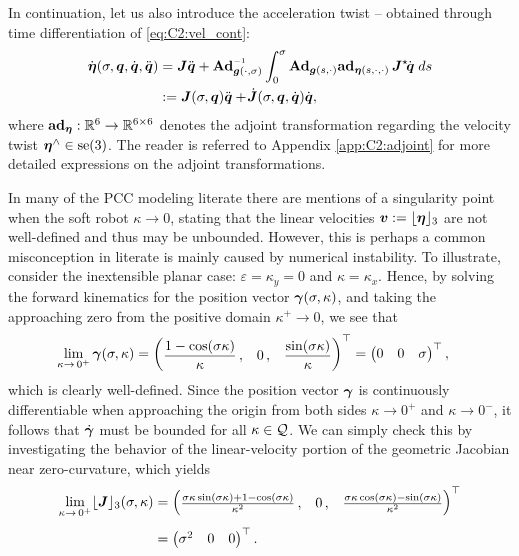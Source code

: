 In continuation, let us also introduce the acceleration twist \cite{Boyer2021,Mochiyama2003,Renda2018} -- obtained through time differentiation of \eqref{eq:C2:vel_cont}:
%
\begin{align}
\dot{\etaB}(\sigma,\q,\dq,\ddq) & = \JB \ddot{\q} + \Ad_{\gB(\cdot,\sigma)} \inv \int_0^\sigma \Ad_{\gB(s,\cdot)}
\ad_{\etaB(s,\cdot,\cdot)} \, \JB^\star\! \dq \;ds \notag \\
& :=  \JB(\sigma,\q)\ddot{\q} + \dmat{J}(\sigma,\q,\dot{\q}) \dot{\q},
\label{eq:C2:acceleration}
\end{align}
%
where $\textbf{ad}_{{\boldsymbol{\eta}}}: \mathbb{R}^{6} \to \mathbb{R}^{6\times 6}$ denotes the adjoint transformation regarding the velocity twist $\boldsymbol{{\boldsymbol{\eta}}}^\wedge \in \textup{\textrm{se}}(3)$. The reader is referred to Appendix \ref{app:C2:adjoint} for more detailed expressions on the adjoint transformations.
%
\begin{rmk} In many of the PCC modeling literate there are mentions of a singularity point when the soft robot $\kappa \to 0$, stating that the linear velocities $\boldsymbol{v} := \lfloor{\boldsymbol{\eta}}\rfloor_3$ are not well-defined and thus may be unbounded. However, this is perhaps a common misconception in literate is mainly caused by numerical instability. To illustrate, consider the inextensible planar case: $\varepsilon = \kappa_y = 0$ and $\kappa = \kappa_x$. Hence, by solving the forward kinematics for the position vector ${\boldsymbol{\gamma}}(\sigma,\kappa)$, and taking the approaching zero from the positive domain $\kappa^{+} \to 0$, we see that
%
\begin{align}
\lim_{\kappa \to \,0^{+}}{\boldsymbol{\gamma}}(\sigma,\kappa) & = \begin{pmatrix} \dfrac{1-\cos(\sigma \kappa)}{\kappa}\,, & 0\,, & \dfrac{\sin(\sigma \kappa)}{\kappa} \end{pmatrix}^\top = \begin{pmatrix} 0 & 0 & \sigma \end{pmatrix}^\top,
\end{align}
%
which is clearly well-defined. Since the position vector ${\boldsymbol{\gamma}}$ is continuously differentiable when approaching the origin from both sides $\kappa \to 0^+$ and $\kappa \to 0^{-}$, it follows that $\dot{{\boldsymbol{\gamma}}}$ must be bounded for all $\kappa \in \mathcal{Q}$. We can simply check this by investigating the behavior of the linear-velocity portion of the geometric Jacobian near zero-curvature, which yields
%
\begin{align}
\lim_{\kappa \to \,0^+} \floor{\JB}_3(\sigma,\kappa) & = \begin{pmatrix} \tfrac{\sigma \kappa \sin(\sigma \kappa) + 1 - \cos(\sigma \kappa)}{\kappa^2}\,, & 0\,, & \tfrac{\sigma \kappa \cos(\sigma \kappa) - \sin(\sigma \kappa) }{\kappa^2} \end{pmatrix}^\top \notag \\[0.35em] & = \begin{pmatrix} \sigma^2 & 0 & 0 \end{pmatrix}^\top.

\end{align}
\end{rmk}
